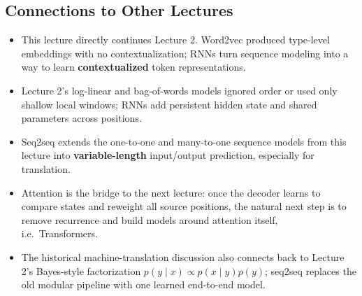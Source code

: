 \documentclass[11pt]{article}
\begin{document}
\subsection{Connections to Other Lectures}
\begin{itemize}
    \item This lecture directly continues Lecture 2. Word2vec produced type-level embeddings with no contextualization; RNNs turn sequence modeling into a way to learn \textbf{contextualized} token representations.
    \item Lecture 2's log-linear and bag-of-words models ignored order or used only shallow local windows; RNNs add persistent hidden state and shared parameters across positions.
    \item Seq2seq extends the one-to-one and many-to-one sequence models from this lecture into \textbf{variable-length} input/output prediction, especially for translation.
    \item Attention is the bridge to the next lecture: once the decoder learns to compare states and reweight all source positions, the natural next step is to remove recurrence and build models around attention itself, i.e.\ Transformers.
    \item The historical machine-translation discussion also connects back to Lecture 2's Bayes-style factorization \(p(y \mid x) \propto p(x \mid y)p(y)\); seq2seq replaces the old modular pipeline with one learned end-to-end model.
\end{itemize}
\end{document}
